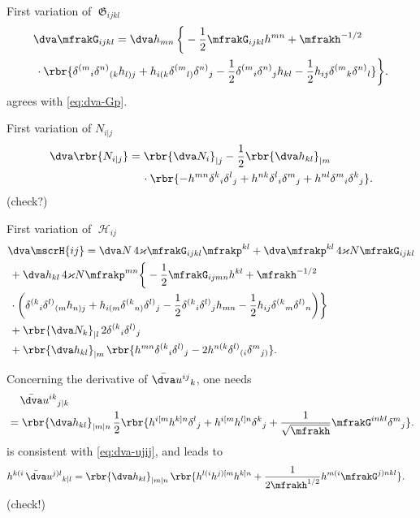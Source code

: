 \documentclass[a4paper,11pt]{article}
\begin{document}
First variation of $\mfrakG_{ijkl}$
\begin{align}
&\dva \mfrakG_{ijkl} = \dva h_{mn}\,\bigg\{ -\frac{1}{2}\mfrakG_{ijkl} h^{mn}
+ \mfrakh^{-1/2}
\nonumber \\
&\,\cdot\rbr{
\delta^{(m}{}_{i} \delta^{n)}{}_{(k} h_{l)j} +
h_{i(k} \delta^{(m}{}_{l)} \delta^{n)}{}_{j} - \frac{1}{2}
\delta^{(m}{}_{i} \delta^{n)}{}_{j} h_{kl} - \frac{1}{2}
h_{ij} \delta^{(m}{}_{k} \delta^{n)}{}_{l}}
\bigg\}.
\label{eq:dva-G}
\end{align}
 agrees with \cref{eq:dva-Gp}.

First variation of $N_{i|j}$
\begin{align}
\dva \rbr{N_{i|j}} &=
\rbr{\dva N_{i}}_{|j} -
\frac{1}{2} \rbr{\dva h_{kl}}_{|m}
\nonumber \\
&\quad\,\cdot \rbr{
- h^{mn} \delta^{k}{}_{i} \delta^{l}{}_{j}
+ h^{nk} \delta^{l}{}_{i} \delta^{m}{}_{j}
+ h^{nl} \delta^{m}{}_{i} \delta^{k}{}_{j}}.
\end{align}
(check?)

First variation of $\mscrH_{ij}$
\begin{align}
&\dva\mscrH{ij} = \dva N\,4\varkappa\mfrakG_{ijkl}\mfrakp^{kl}
+ \dva\mfrakp^{kl}\,4\varkappa N \mfrakG_{ijkl}
\nonumber \\
&\,+
\dva h_{kl}\,4\varkappa N \mfrakp^{mn}
\bigg\{-\frac{1}{2}\mfrakG_{ijmn}h^{kl} 
+ \mfrakh^{-1/2}
\nonumber \\
&\,\cdot\bigg(
\delta^{(k}{}_{i} \delta^{l)}{}_{(m} h_{n)j} +
h_{i(m} \delta^{(k}{}_{n)} \delta^{l)}{}_{j} - \frac{1}{2}
\delta^{(k}{}_{i} \delta^{l)}{}_{j} h_{mn} - \frac{1}{2}
h_{ij} \delta^{(k}{}_{m} \delta^{l)}{}_{n} \bigg)\bigg\}
\nonumber \\
&\,+
\rbr{\dva N_k}_{|l}\, 2 \delta^{(k}{}_{i}\delta^{l)}{}_{j}
\nonumber \\
&\,+
\rbr{\dva h_{kl}}_{|m}\, \rbr{
h^{mn} \delta^{(k}{}_{i} \delta^{l)}{}_{j} - 2
h^{n(k} \delta^{l)}{}_{(i} \delta^{m}{}_{j)}}.
\end{align}


Concerning the derivative of $\bar{\dva}u^{ij}{}_k$, one needs
\begin{align}
&\quad\,
\bar{\dva}u^{ik}{}_{j|k} 
\nonumber \\
&=
\rbr{\dva h_{kl}}_{|m|n}\,
\frac{1}{2} \rbr{h^{i[m} h^{k]n} \delta^l{}_j + h^{i[m}h^{l]n} \delta^k{}_j
+ \frac{1}{\sqrt{\mfrakh}} \mfrakG^{inkl} \delta^m{}_j}.
\label{eq:dva-uikj|k}
\end{align}
 is consistent with \cref{eq:dva-ujij}, and leads to
\begin{align}
h^{k(i}\,\bar{\dva}u^{j)l}{}_{k|l} &=
\rbr{\dva h_{kl}}_{|m|n}\,\rbr{h^{l(i}h^{j)[m}h^{k]n}
+\frac{1}{2\mfrakh^{1/2}} h^{m(i}\mfrakG^{j)nkl}}.
\label{eq:hki-dva-ujlk|l}
\end{align}
(check!)
\end{document}

